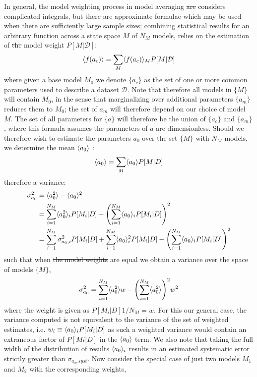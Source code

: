 \documentclass[10pt]{article}[draft]
\begin{document}
In general, the model weighting process in model averaging \st{are} considers complicated integrals, but there are approximate formulae which may be used when there are  sufficiently large sample sizes; combining statistical results for an arbitrary function across a state space ${M}$ of $N_M$ models, relies on the estimation of \st{the} model weight $P[M|\mathcal{D}]$:
\begin{equation}
	\inn{f(a_c)} = \sum_M 	\inn{f(a_c)}_M P[M|\mathcal{D}]
\end{equation}
where given a base model $M_0$  we denote $\{a_c\}$ as the set of one or more common parameters used to describe a dataset $\mathcal{D}$. Note that therefore  all models in $\{M\}$ will contain $M_0$, in the sense that marginalizing over additional parameters $\{a_m\}$ reduces them to $M_0$; the set of $a_m$ will therefore depend on our choice of model $M$.  The set of all parameters for $\{a\}$ will therefore be the union of $\{a_c\}$ and $\{a_m\}$, where this formula assumes the parameters of $a$ are dimensionless. Should we therefore wish to estimate the parameters $a_0$ over the set $\{M\}$ with $N_M$ models, we determine the mean $\inn{a_0}$ \cite{kass1995bayes}:
\begin{equation}
	\inn{a_0} = \sum_M  \inn{a_0}  P[M|D]
\end{equation}
therefore a variance:
\begin{equation}
\begin{split}
\sigma_{a_0}^2 & = 	\inn{a_0^2} - 	\inn{a_0}^2  \\
& =  \sum_{i=1}^{N_M}  \inn{a_0^2}_i  P[M_i|D] - \Biggl( \sum_{i=1}^{N_M}  \inn{a_0}_i  P[M_i|D] \Biggr)^2 \\
& =  \sum_{i=1}^{N_M} \sigma_{a_0,i}^2 P[M_i|D] +  \sum_{i=1}^{N_M}  \inn{a_0}_i^2  P[M_i|D] - \Biggl( \sum_{i=1}^{N_M}  \inn{a_0}_i  P[M_i|D] \Biggr)^2 \\
\end{split}
\end{equation}
such that when \st{the model weights} are equal we obtain a variance over the space of models $\{M\}$,
\begin{equation}
	\begin{split}
	\sigma_{a_0}^2 =  \sum_{i=1}^{N_M}  \inn{a_0^2} w - \Biggl( \sum_{i=1}^{N_M} \inn{a_0^2} \Biggr)^2 w^2
	\end{split}
\label{general_form}
\end{equation}
where the weight is given as $P[M_i|D]  {1/N_M} = w$. For this our general case, the variance computed is not equivalent to the variance of the set of weighted estimates, i.e. $w_i \equiv \inn{a_0}_i P[M_i | D]$ as such a weighted variance would contain an extraneous factor of $P[Mi|D]$ in the $\inn{a_0}$ term. We also note that taking the full width of the distribution of results $\inn{a_0}_i$ results in an estimated systematic error strictly greater than $\sigma_{a_0,syst}$. Now consider the special case of just two models $M_1$ and $M_2$ with the corresponding weights,
\end{document}
